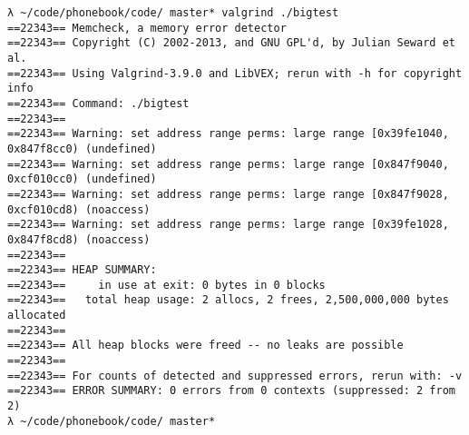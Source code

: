 \documentclass{article}
\begin{document}
\begin{verbatim}
λ ~/code/phonebook/code/ master* valgrind ./bigtest
==22343== Memcheck, a memory error detector
==22343== Copyright (C) 2002-2013, and GNU GPL'd, by Julian Seward et al.
==22343== Using Valgrind-3.9.0 and LibVEX; rerun with -h for copyright info
==22343== Command: ./bigtest
==22343== 
==22343== Warning: set address range perms: large range [0x39fe1040, 0x847f8cc0) (undefined)
==22343== Warning: set address range perms: large range [0x847f9040, 0xcf010cc0) (undefined)
==22343== Warning: set address range perms: large range [0x847f9028, 0xcf010cd8) (noaccess)
==22343== Warning: set address range perms: large range [0x39fe1028, 0x847f8cd8) (noaccess)
==22343== 
==22343== HEAP SUMMARY:
==22343==     in use at exit: 0 bytes in 0 blocks
==22343==   total heap usage: 2 allocs, 2 frees, 2,500,000,000 bytes allocated
==22343== 
==22343== All heap blocks were freed -- no leaks are possible
==22343== 
==22343== For counts of detected and suppressed errors, rerun with: -v
==22343== ERROR SUMMARY: 0 errors from 0 contexts (suppressed: 2 from 2)
λ ~/code/phonebook/code/ master* 

\end{verbatim}
\end{document}
